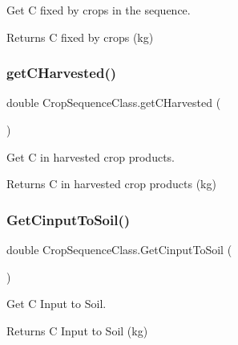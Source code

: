 Get C fixed by crops in the sequence. 

\begin{DoxyReturn}{Returns}
C fixed by crops (kg) 
\end{DoxyReturn}
\mbox{\label{class_crop_sequence_class_a9bc2f3e9444586ed86c4603aa91fb9b6}} 
\subsubsection{\texorpdfstring{getCHarvested()}{getCHarvested()}}
{\footnotesize\ttfamily double Crop\+Sequence\+Class.\+get\+C\+Harvested (\begin{DoxyParamCaption}{ }\end{DoxyParamCaption})\hspace{0.3cm}{\ttfamily [inline]}}



Get C in harvested crop products. 

\begin{DoxyReturn}{Returns}
C in harvested crop products (kg) 
\end{DoxyReturn}
\mbox{\label{class_crop_sequence_class_a7af568e3825da6fc14939143d5c92f3d}} 
\subsubsection{\texorpdfstring{GetCinputToSoil()}{GetCinputToSoil()}}
{\footnotesize\ttfamily double Crop\+Sequence\+Class.\+Get\+Cinput\+To\+Soil (\begin{DoxyParamCaption}{ }\end{DoxyParamCaption})\hspace{0.3cm}{\ttfamily [inline]}}



Get C Input to Soil. 

\begin{DoxyReturn}{Returns}
C Input to Soil (kg) 
\end{DoxyReturn}
\mbox{\label{class_crop_sequence_class_a175d714ee202041183d28dc2f5053bfa}} 
